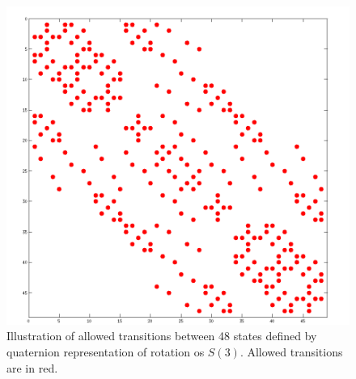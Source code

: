 \begin{figure}[h!]
\begin{center}
\includegraphics[scale=0.5]{figures/chap2/sparce.png}
\caption{Illustration of allowed transitions between 48 states defined by quaternion representation of  rotation os $S(3)$. Allowed transitions are in red. }
\label{figure:blumediag}
\end{center}
\end{figure}  
\clearpage

